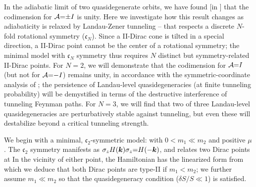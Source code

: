 \documentclass[aps, prb, showpacs, twocolumn, notitlepage, superscriptaddress]{revtex4-1}
\begin{document}
In the adiabatic limit of two quasidegenerate orbits, we have found [in ] that the codimension for ${\cal A}{=}{\pm} I$ is unity. Here we investigate how this result changes as adiabaticity is relaxed by Landau-Zener tunneling -- that respects a discrete $N$-fold rotational symmetry ($\mathfrak{c}_N$). Since a II-Dirac cone is tilted in a special direction, a II-Dirac point cannot be the center of a rotational symmetry; the minimal model with $\mathfrak{c}_N$ symmetry thus requires $N$ distinct but symmetry-related II-Dirac points. For $N{=}2$, we will demonstrate that the codimension for ${\cal A}{=}I$ (but not for ${\cal A}{=}{-}I$) remains unity, in accordance with the symmetric-coordinate analysis of ; the persistence of  Landau-level quasidegeneracies  (at finite tunneling probability) will be demystified in terms of the destructive interference of tunneling Feynman paths. For $N{=}3$, we will find that two of three Landau-level quasidegeneracies are perturbatively stable against tunneling, but even these will destabilize beyond a critical tunneling strength.




We begin with a minimal, $\mathfrak{c}_2$-symmetric model:
with $0{<}m_1{\ll}m_2$ and positive $\mu$.  The $\mathfrak{c}_2$ symmetry manifests as $\sigma_z H(\boldsymbol{k})\sigma_z{=}H({-}\boldsymbol{k})$, and relates 
two Dirac points at
In the vicinity of either point, the  Hamiltonian has the linearized form 
from which we deduce that both Dirac points are  type-II if $m_1{<}m_2$; we further assume $m_1{\ll}m_2$ so that the quasidegeneracy condition ($\delta S/S{\ll}1$) is satisfied. 
\end{document}
